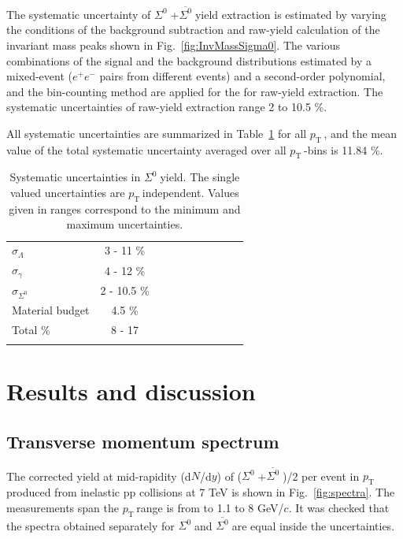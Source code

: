 \documentclass[ALICE,manyauthors]{cernphprep}
\newcommand{\sig}{\ensuremath{\Sigma^0  \; }}
\newcommand{\asig}{\ensuremath{\overline{\Sigma^0} \; }}
\newcommand{\pt}{\ensuremath{p_{\mathrm{T}\; }}}
\begin{document}
The systematic uncertainty of \sig+\asig yield extraction is estimated by 
 varying the conditions of the background subtraction and raw-yield calculation of the invariant mass peaks
shown in Fig.~\ref{fig:InvMassSigma0}. The various combinations of the signal and the background 
distributions estimated by a mixed-event ($e^+e^-$ pairs from different events) and a second-order polynomial, 
and the bin-counting method are applied for the for raw-yield extraction. The systematic uncertainties of 
raw-yield extraction range 2 to 10.5 \%. 

All systematic uncertainties are summarized in Table~\ref{tab:sys} for all \pt, and the mean value of the total systematic 
uncertainty averaged over all $\pt$-bins is 11.84 \%. 

\begin{table}[h!]
\centering
\begin{tabular}{lccccccccc}
\hline\noalign{\smallskip}
$\sigma_{\Lambda}$                &  3 - 11 \% \\
$\sigma_{\gamma}$                &  4 - 12  \% \\
$\sigma_{\Sigma^0}$                 & 2 - 10.5  \% \\ 
Material budget       & 4.5 \% \\
\hline\noalign{\smallskip}

Total \%                 & 8 - 17 \\

\hline\noalign{\smallskip}

\end{tabular}
\caption{Systematic uncertainties in \sig yield. The single valued uncertainties are \pt independent. 
Values given in ranges correspond to the minimum and maximum uncertainties.
}
\label{tab:sys}    
\end{table} 

 \section{Results and discussion}
 \label{sec:results}

 \subsection{Transverse momentum spectrum} 
 \label{subsec:pT}

The corrected yield at mid-rapidity (d$N$/d$y$) of (\sig+\asig)/2 per event in \pt produced from inelastic pp collisions 
at 7 TeV is shown in Fig.~\ref{fig:spectra}. The measurements span the \pt range is from to 1.1 to 8 GeV/$c$. 
It was checked that the spectra obtained separately for \sig and \asig are equal inside the uncertainties.
\end{document}
